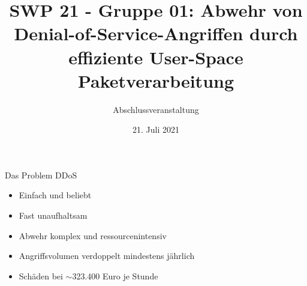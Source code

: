 \documentclass{beamer}
\title{SWP 21 - Gruppe 01: Abwehr von Denial-of-Service-Angriffen durch effiziente User-Space Paketverarbeitung}
\subtitle{Abschlussveranstaltung}
\institute{Technische Universität Ilmenau}
\date{21. Juli 2021}
\begin{document}
\begin{frame}
    \maketitle
\end{frame}

\begin{frame}{Das Problem DDoS\footnotemark}
    \center
    \begin{itemize}
        \pause
        \item \alert{Einfach} und \alert{beliebt}
              \pause
        \item Fast \alert{unaufhaltsam}
              \pause
        \item Abwehr komplex und \alert{ressourcenintensiv}
              \pause
        \item Angriffsvolumen \alert{verdoppelt} mindestens jährlich  \footnotemark
              \pause
        \item Schäden bei $\sim$323.400 Euro je Stunde \footnotemark
    \end{itemize}

\end{frame}
\end{document}
